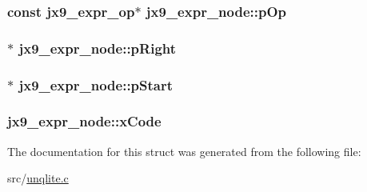 \hypertarget{structjx9__expr__node_a2ef888861a61fa6731d27ce68e567207}{
\subsubsection[{p\-Op}]{\setlength{\rightskip}{0pt plus 5cm}const {\bf jx9\-\_\-expr\-\_\-op}$\ast$ jx9\-\_\-expr\-\_\-node\-::p\-Op}}\label{d4/d70/structjx9__expr__node_a2ef888861a61fa6731d27ce68e567207}
\hypertarget{structjx9__expr__node_a87663c2aabfebf444ec6d5baf4c75cc0}{
\subsubsection[{p\-Right}]{$\ast$ jx9\-\_\-expr\-\_\-node\-::p\-Right}}\label{d4/d70/structjx9__expr__node_a87663c2aabfebf444ec6d5baf4c75cc0}
\hypertarget{structjx9__expr__node_a8f818961af71cd65469582f5dcc36799}{
\subsubsection[{p\-Start}]{$\ast$ jx9\-\_\-expr\-\_\-node\-::p\-Start}}\label{d4/d70/structjx9__expr__node_a8f818961af71cd65469582f5dcc36799}
\hypertarget{structjx9__expr__node_af7e91e818d8df125904493dc93534a9f}{
\subsubsection[{x\-Code}]{ jx9\-\_\-expr\-\_\-node\-::x\-Code}}\label{d4/d70/structjx9__expr__node_af7e91e818d8df125904493dc93534a9f}


The documentation for this struct was generated from the following file\-:\begin{DoxyCompactItemize}
\item 
src/\hyperlink{unqlite_8c}{unqlite.\-c}\end{DoxyCompactItemize}
